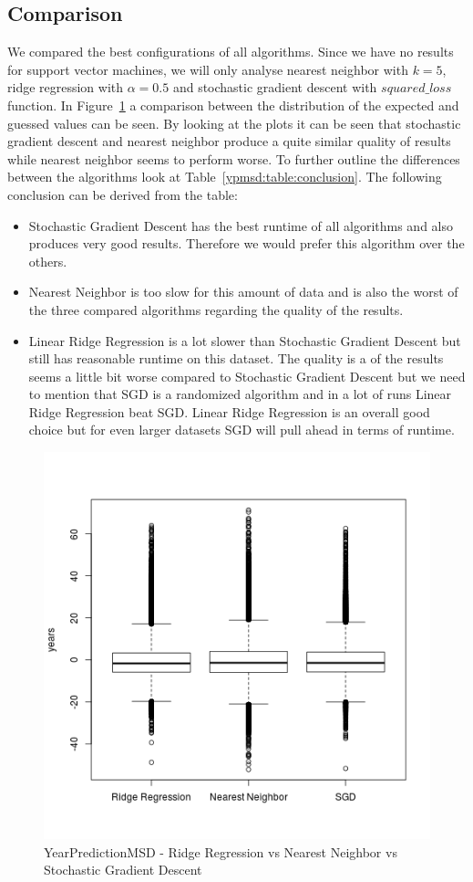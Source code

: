 \subsection{Comparison}
We compared the best configurations of all algorithms. Since we have no results for support vector machines, we will only analyse nearest neighbor with $k=5$, ridge regression with $\alpha=0.5$ and stochastic gradient descent with $squared\_loss$ function. In Figure~\ref{ypmsd:fig:conclusion} a comparison between the distribution of the expected and guessed values can be seen. By looking at the plots it can be seen that stochastic gradient descent and nearest neighbor produce a quite similar quality of results while nearest neighbor seems to perform worse. To further outline the differences between the algorithms look at Table~\ref{ypmsd:table:conclusion}. The following conclusion can be derived from the table:
\begin{itemize}
	\item Stochastic Gradient Descent has the best runtime of all algorithms and also produces very good results. Therefore we would prefer this algorithm over the others.
	\item Nearest Neighbor is too slow for this amount of data and is also the worst of the three compared algorithms regarding the quality of the results.
	\item Linear Ridge Regression is a lot slower than Stochastic Gradient Descent but still has reasonable runtime on this dataset. The quality is a of the results seems a little bit worse compared to Stochastic Gradient Descent but we need to mention that SGD is a randomized algorithm and in a lot of runs Linear Ridge Regression beat SGD. Linear Ridge Regression is an overall good choice but for even larger datasets SGD will pull ahead in terms of runtime.
\end{itemize}
\begin{figure}[p]
	\center
	\includegraphics[scale=\figurescaling]{figures/ypmsd_conclusion.png}
	\caption{YearPredictionMSD - Ridge Regression vs Nearest Neighbor vs Stochastic Gradient Descent \label{ypmsd:fig:conclusion}}
\end{figure}
